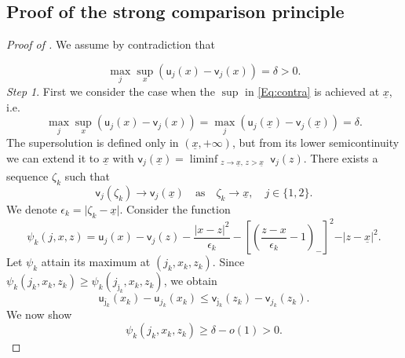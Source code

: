 \documentclass[11pt]{article}
\numberwithin{equation}{section}
\theoremstyle{definition}
\newcommand{\ux}{{\underline x}}
\newcommand{\beq}{\begin{equation}}
\newcommand{\eeq}{\end{equation}}
\newcommand{\e}{\epsilon}
\theoremstyle{plain}
\begin{document}
\begin{appendices}

\makeatletter
\renewcommand{\@seccntformat}[1]{%
  \ifx#1\section
    Appendix~\csname the#1\endcsname\quad
  \else
    \csname the#1\endcsname\quad
  \fi}
\makeatother
\section{Proof of the strong comparison principle}\label{Comparison proof}
\begin{proof}[Proof of ]
We assume by contradiction that 

\beq\label{Eq:contra}
\max_j\sup_x(\mathsf{u}_j(x)-\mathsf{v}_j(x))=\delta>0.
\eeq
{\it{Step 1}}. First we consider the case when the $\sup$ in \eqref{Eq:contra} is achieved at $\ux$, i.e.
\beq\label{Eq:contra-bd}
\max_j\sup_x(\mathsf{u}_j(x)-\mathsf{v}_j(x))=\max_j(\mathsf{u}_j(\ux)-\mathsf{v}_j(\ux))=\delta.
\eeq
The supersolution is defined only in $(\ux,+\infty)$, but from its lower semicontinuity we can extend it to $\ux$ with $\mathsf{v}_j(\ux)=\liminf_{\substack{z\rightarrow \ux,\, z>\ux}} \mathsf{v}_j(z)$. {There exists a sequence $\zeta_k$ such that 
\beq\label{Eq: zeta_k}
\mathsf{v}_j(\zeta_k)\to \mathsf{v}_j(\ux)\quad {\text{as}}\quad \zeta_k\to \ux,\quad j\in \{1,2\}.
\eeq}
We denote $\e_k=\vert \zeta_k-\ux\vert$. Consider the   function
\beq
\psi_k(j,x,z)=\mathsf{u}_j(x)-\mathsf{v}_j(z)-\frac{\vert x-z\vert^2}{\e_k}-\left[\left(\frac{z-x}{\e_k}-1\right)_{-}\right]^2-\vert z-\ux\vert^2.
\eeq
Let $\psi_k$ attain its maximum at $(j_{k}, x_{k},z_{k})$. Since $\psi_k(j_{k},x_{k},z_{k})\geq \psi_k(j_{\bar{\jmath}_{k}},x_{k},z_{k})$, we obtain
\beq\label{v1 v2}
\mathsf{u}_{\bar{\jmath}_{k}}(x_{k})-\mathsf{u}_{j_{k}}(x_{k})\leq \mathsf{v}_{\bar{\jmath}_{k}}(z_{k})-\mathsf{v}_{j_{k}}(z_{k}).
\eeq
We now show 
\beq\label{psi_k}
\psi_k(j_{k},x_{k},z_{k})\geq \delta-o(1)>0. 
\eeq


\end{proof}
\end{appendices}
\end{document}
